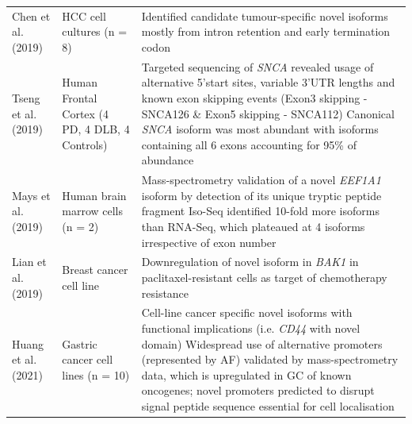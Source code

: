 \begin{landscape}
\begin{longtable}[c]{p{4cm}p{4cm}p{18cm}}
		\centering Chen et al. (2019) \cite{Chen2019} &
		\centering HCC cell cultures (n = 8)  &
		\tabitem Identified candidate tumour-specific novel isoforms mostly from intron retention and early termination codon\\
		\hdashline[0.5pt/5pt]
		
		\centering Tseng et al. (2019) \cite{Tseng2019} &
		\centering Human Frontal Cortex \newline (4 PD, 4 DLB, 4 Controls)  &
		\tabitem Targeted sequencing of \textit{SNCA} revealed usage of alternative 5'start sites, variable 3'UTR lengths and known exon skipping events (Exon3 skipping - SNCA126 \& Exon5 skipping - SNCA112) \newline 
		\tabitem Canonical \textit{SNCA} isoform was most abundant with isoforms containing all 6 exons accounting for 95\% of abundance\\
		\hdashline[0.5pt/5pt]
		
		\centering Mays et al. (2019)\cite{DeslattesMays2019} &
		\centering Human brain marrow cells (n = 2)  &
		\tabitem  Mass-spectrometry validation of a novel \textit{EEF1A1} isoform by detection of its unique tryptic peptide fragment \newline 
		\tabitem Iso-Seq identified 10-fold more isoforms than RNA-Seq, which plateaued at 4 isoforms irrespective of exon number \\
		\hdashline[0.5pt/5pt]
		
		\centering Lian et al. (2019) \cite{Lian2019} &
		\centering Breast cancer cell line &
		\tabitem Downregulation of novel isoform in \textit{BAK1} in paclitaxel-resistant cells as target of chemotherapy resistance \\
		\hdashline[0.5pt/5pt]
		
		\centering Huang et al. (2021) \cite{Huang2021} &
		\centering Gastric cancer cell lines (n = 10) &
		\tabitem Cell-line cancer specific novel isoforms with functional implications (i.e. \textit{CD44} with novel domain) \newline
		\tabitem Widespread use of alternative promoters (represented by AF) validated by mass-spectrometry data, which is upregulated in GC of known oncogenes; novel promoters predicted to disrupt signal peptide sequence essential for cell localisation   \\* \bottomrule
	\end{longtable}
	

\end{landscape}
